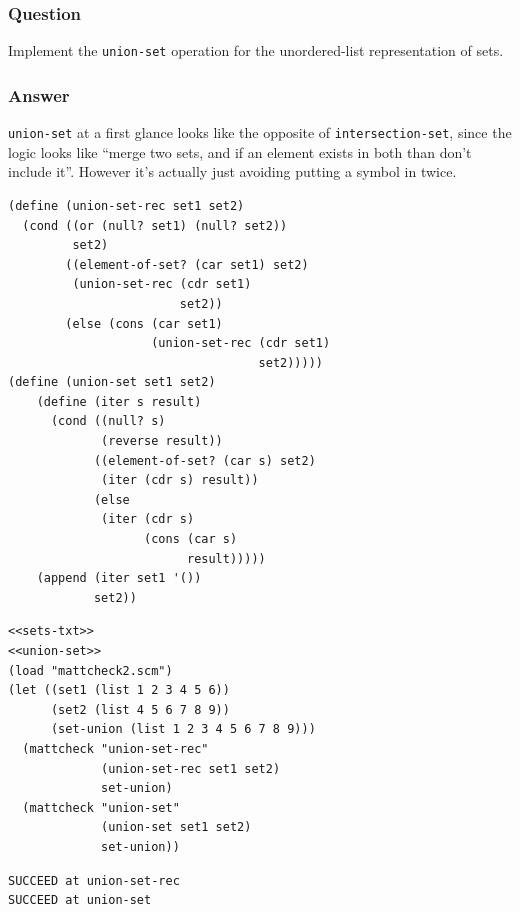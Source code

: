 \documentclass[final,fleqn,titlepage,twoside]{article}
\begin{document}
\subsubsection{Question}
\label{sec:org68cb619}
Implement the \texttt{union-set} operation for the unordered-list representation of sets.

\subsubsection{Answer}
\label{sec:org73aa03d}
\texttt{union-set} at a first glance looks like the opposite of
\texttt{intersection-set}, since the logic looks like ``merge two sets, and if
an element exists in both than don't include it''. However it's actually just
avoiding putting a symbol in twice.


\begin{verbatim}
(define (union-set-rec set1 set2)
  (cond ((or (null? set1) (null? set2))
         set2)
        ((element-of-set? (car set1) set2)
         (union-set-rec (cdr set1)
                        set2))
        (else (cons (car set1)
                    (union-set-rec (cdr set1)
                                   set2)))))
(define (union-set set1 set2)
    (define (iter s result)
      (cond ((null? s)
             (reverse result))
            ((element-of-set? (car s) set2)
             (iter (cdr s) result))
            (else
             (iter (cdr s)
                   (cons (car s)
                         result)))))
    (append (iter set1 '())
            set2))
\end{verbatim}

\begin{verbatim}
<<sets-txt>>
<<union-set>>
(load "mattcheck2.scm")
(let ((set1 (list 1 2 3 4 5 6))
      (set2 (list 4 5 6 7 8 9))
      (set-union (list 1 2 3 4 5 6 7 8 9)))
  (mattcheck "union-set-rec"
             (union-set-rec set1 set2)
             set-union)
  (mattcheck "union-set"
             (union-set set1 set2)
             set-union))
\end{verbatim}

\begin{verbatim}
SUCCEED at union-set-rec
SUCCEED at union-set
\end{verbatim}
\end{document}
